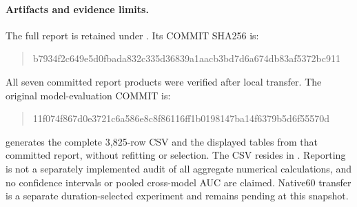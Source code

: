 \paragraph{Artifacts and evidence limits.}
The full report is retained under
. Its COMMIT SHA256 is:
\begin{quote}\scriptsize\ttfamily
b7934f2c649e5d0fbada832c335d36839a1aacb3bd7d6a674db83af5372bc911
\end{quote}
All seven committed report products were verified after local transfer.
The original model-evaluation COMMIT is:
\begin{quote}\scriptsize\ttfamily
11f074f867d0e3721c6a586e8c8f86116ff1b0198147ba14f6379b5d6f55570d
\end{quote}
 generates the complete 3,825-row
CSV and the displayed tables from that committed report, without refitting or
selection. The CSV resides in
. Reporting is not a
separately implemented audit of all aggregate numerical calculations, and no
confidence intervals or pooled cross-model AUC are claimed. Native60 transfer
is a separate duration-selected experiment and remains pending at this snapshot.

